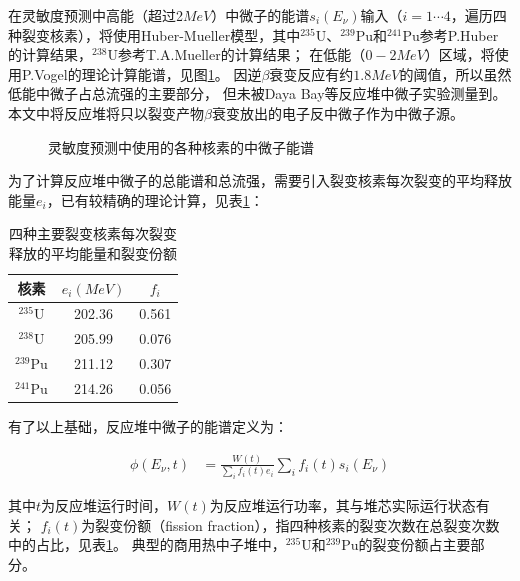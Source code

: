 在灵敏度预测中高能（超过2$\si{MeV}$）中微子的能谱$s_i(E_\nu)$输入（$i=1\cdots4$，遍历四种裂变核素），将使用Huber-Mueller模型，其中${}^{235}\mathrm{U}$、${}^{239}\mathrm{Pu}$和${}^{241}\mathrm{Pu}$参考P.Huber的计算结果\cite{huber_determination_2011}，${}^{238}\mathrm{U}$参考T.A.Mueller的计算结果\cite{mueller_improved_2011}；
在低能（$0-2\si{MeV}$）区域，将使用P.Vogel的理论计算能谱\cite{p_vogel_neutrino_1989}，见图\ref{fig:neutrino_energy_spectrum}。
因逆$\beta$衰变反应有约$1.8\si{MeV}$的阈值，所以虽然低能中微子占总流强的主要部分，
但未被Daya Bay等反应堆中微子实验测量到\cite{an_improved_2017}。
本文中将反应堆将只以裂变产物$\beta$衰变放出的电子反中微子作为中微子源。

\begin{figure}
    \centering
    
    \caption{\label{fig:neutrino_energy_spectrum} 灵敏度预测中使用的各种核素的中微子能谱}
\end{figure}

为了计算反应堆中微子的总能谱和总流强，需要引入裂变核素每次裂变的平均释放能量$e_i$，已有较精确的理论计算\cite{ma_improved_2013}，见表\ref{tab:per_fission}：

\begin{table}
  \centering
  \caption{四种主要裂变核素每次裂变释放的平均能量和裂变份额}
  \begin{tabular}{ccc}
    \toprule
    核素 & $e_i(\si{MeV})$ & $f_i$ \\
    \midrule
    ${}^{235}\mathrm{U}$ & 202.36 & 0.561 \\
    ${}^{238}\mathrm{U}$ & 205.99 & 0.076 \\
    ${}^{239}\mathrm{Pu}$ & 211.12 & 0.307 \\
    ${}^{241}\mathrm{Pu}$ & 214.26 & 0.056 \\
    \bottomrule
  \end{tabular}
  \label{tab:per_fission}
\end{table}

有了以上基础，反应堆中微子的能谱定义为：

\begin{align}
    \label{eq:sum_spectrum}
    \phi\left(E_\nu,t\right) &= \frac{W(t)}{\sum_i f_i(t)e_i}\sum_i f_i(t)s_i(E_\nu)
\end{align}

其中$t$为反应堆运行时间，$W(t)$为反应堆运行功率，其与堆芯实际运行状态有关\cite{juno_collaboration_tao_2020}；
$f_i(t)$为裂变份额（fission fraction），指四种核素的裂变次数在总裂变次数中的占比，见表\ref{tab:per_fission}。
典型的商用热中子堆中，${}^{235}\mathrm{U}$和${}^{239}\mathrm{Pu}$的裂变份额占主要部分。

